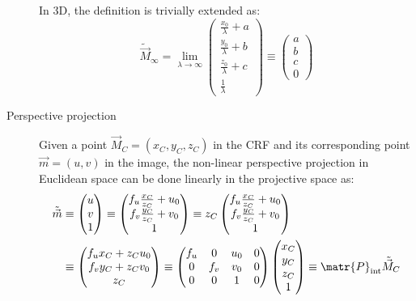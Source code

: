 \begin{description}
        In 3D, the definition is trivially extended as:
        \[ 
            \tilde{\vec{M}}_\infty = 
            \lim_{\lambda \rightarrow \infty} \begin{pmatrix} \frac{x_0}{\lambda} + a \\ \frac{y_0}{\lambda} + b \\ \frac{z_0}{\lambda} + c \\ \frac{1}{\lambda} \end{pmatrix} \equiv
            \begin{pmatrix} a \\ b \\ c \\ 0 \end{pmatrix}
        \]

    \item[Perspective projection] 
        Given a point $\vec{M}_C = (x_C, y_C, z_C)$ in the CRF and its corresponding point $\vec{m} = (u, v)$ in the image,
        the non-linear perspective projection in Euclidean space can be done linearly in the projective space as:
        \[  
            \begin{split}
                \tilde{\vec{m}} &\equiv 
                \begin{pmatrix} u \\ v \\ 1 \end{pmatrix} \equiv
                \begin{pmatrix} f_u\frac{x_C}{z_C} + u_0 \\ f_v\frac{y_C}{z_C} +v_0 \\ 1 \end{pmatrix} \equiv
                z_C \begin{pmatrix} f_u\frac{x_C}{z_C} + u_0 \\ f_v\frac{y_C}{z_C} +v_0 \\ 1 \end{pmatrix} \\
                &\equiv \begin{pmatrix} f_u x_C + z_C u_0 \\ f_v y_C + z_C v_0 \\ z_C \end{pmatrix} \equiv
                \begin{pmatrix} f_u & 0 & u_0 & 0 \\ 0 & f_v & v_0 & 0 \\ 0 & 0 & 1 & 0 \end{pmatrix} \begin{pmatrix} x_C \\ y_C \\ z_C \\ 1 \end{pmatrix} \equiv
                \matr{P}_\text{int} \tilde{\vec{M}}_C
            \end{split}
        \]


\end{description}
